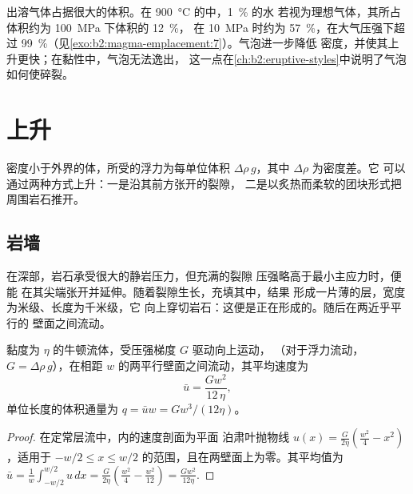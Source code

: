 出溶气体占据很大的体积。在 \qty{900}{\celsius} 的中，\qty{1}{\percent} 的水
若视为理想气体，其所占体积约为 \qty{100}{MPa} 下体积的 \qty{12}{\percent}，
在 \qty{10}{MPa} 时约为 \qty{57}{\percent}，在大气压强下超过
\qty{99}{\percent}（见\cref{exo:b2:magma-emplacement:7}）。气泡进一步降低
密度，并使其上升更快；在黏性中，气泡无法逸出，
这一点在\cref{ch:b2:eruptive-styles}中说明了气泡如何使碎裂。

\section{上升}

密度小于外界的体，所受的浮力为每单位体积
$\Delta\rho\,g$，其中 $\Delta\rho$ 为密度差。它
可以通过两种方式上升：一是沿其前方张开的裂隙，
二是以炙热而柔软的团块形式把周围岩石推开。

\subsection{岩墙}

在深部，岩石承受很大的静岩压力，但充满的裂隙
压强略高于最小主应力时，便能
在其尖端张开并延伸。随着裂隙生长，充填其中，结果
形成一片薄的层，宽度为米级、长度为千米级，它
向上穿切岩石：这便是正在形成的。随后在两近乎平行的
壁面之间流动。

\begin{proposition}[岩墙中岩浆的流动]\label{prop:b2:magma-emplacement:poiseuille}
黏度为 $\eta$ 的牛顿流体，受压强梯度 $G$ 驱动向上运动，
（对于浮力流动，$G = \Delta\rho\,g$），在相距 $w$
的两平行壁面之间流动，其平均速度为
\[
\bar u = \frac{G w^2}{12\,\eta},
\]
单位长度的体积通量为 $q = \bar u w = G w^3/(12\eta)$。
\end{proposition}

\begin{proof}
在定常层流中，内的速度剖面为平面
泊肃叶抛物线 $u(x) = \frac{G}{2\eta}\left(\frac{w^2}{4} - x^2\right)$，适用于
$-w/2 \le x \le w/2$ 的范围，且在两壁面上为零。其平均值为
$\bar u = \frac1w\int_{-w/2}^{w/2}u\,dx = \frac{G}{2\eta}\left(\frac{w^2}{4} -
\frac{w^2}{12}\right) = \frac{Gw^2}{12\eta}$.
\end{proof}

